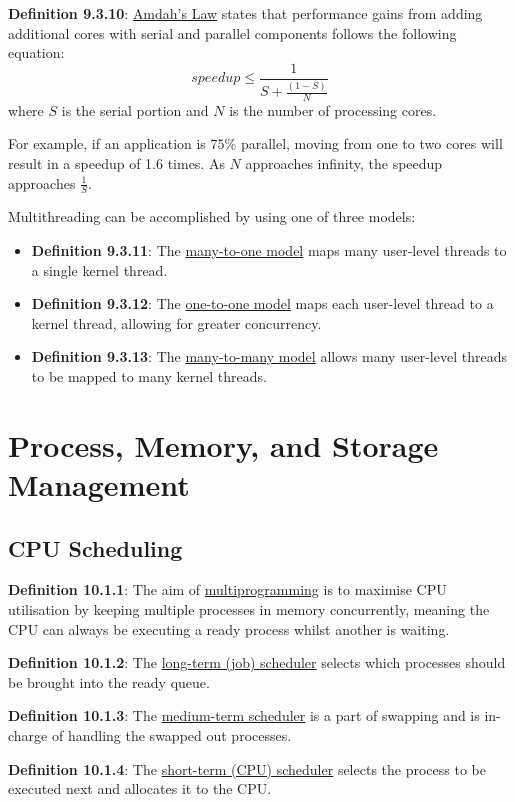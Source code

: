 \documentclass{article}
\newcommand{\separate}[1] {\vspace{#1 pt}\noindent}
\newcommand{\definition}[2]{\textbf{Definition #1}: #2\label{def:#1}}
\begin{document}
\separate{7}\definition{9.3.10}{\underline{Amdah's Law} states that performance gains from adding additional cores with serial and parallel components follows the following equation:
\begin{equation}
    speedup \leq \frac{1}{S+\frac{(1-S)}{N}}
\end{equation}
where \(S\) is the serial portion and \(N\) is the number of processing cores.}

\separate{3}For example, if an application is \(75\%\) parallel, moving from one to two cores will result in a speedup of 1.6 times. As \(N\) approaches infinity, the speedup approaches \(\frac{1}{S}\).

\separate{7}Multithreading can be accomplished by using one of three models:
\begin{itemize}
    \item \definition{9.3.11}{The \underline{many-to-one model} maps many user-level threads to a single kernel thread.}
    \item \definition{9.3.12}{The \underline{one-to-one model} maps each user-level thread to a kernel thread, allowing for greater concurrency.}
    \item \definition{9.3.13}{The \underline{many-to-many model} allows many user-level threads to be mapped to many kernel threads.}
\end{itemize}

\section{Process, Memory, and Storage Management}

\subsection{CPU Scheduling}

\definition{10.1.1}{The aim of \underline{multiprogramming} is to maximise CPU utilisation by keeping multiple processes in memory concurrently, meaning the CPU can always be executing a ready process whilst another is waiting.}

\separate{7}\definition{10.1.2}{The \underline{long-term (job) scheduler} selects which processes should be brought into the ready queue.}

\separate{7}\definition{10.1.3}{The \underline{medium-term scheduler} is a part of swapping and is in-charge of handling the swapped out processes.}

\separate{7}\definition{10.1.4}{The \underline{short-term (CPU) scheduler} selects the process to be executed next and allocates it to the CPU.}
\end{document}

